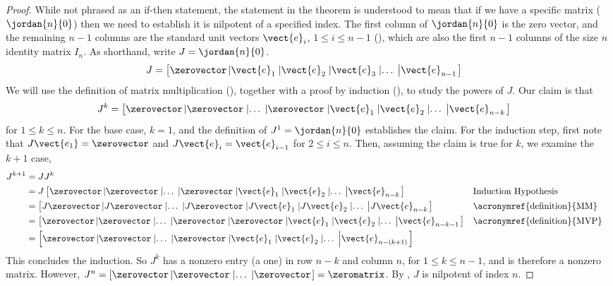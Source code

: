 \begin{proof}
While not phrased as an if-then statement, the statement in the theorem is understood to mean that if we have a specific matrix ($\jordan{n}{0}$) then we need to establish it is nilpotent of a specified index.  The first column of $\jordan{n}{0}$ is the zero vector, and the remaining $n-1$ columns are the standard unit vectors $\vect{e}_i$, $1\leq i\leq n-1$ (), which are also the first $n-1$ columns of the size $n$ identity matrix $I_n$.  As shorthand, write $J=\jordan{n}{0}$.
%
\begin{align*}
J&=
\left[\zerovector\left|\vect{e}_1\right.\left|\vect{e}_2\right.\left|\vect{e}_3\right.\left|\dots\right.\left|\vect{e}_{n-1}\right.\right]
\end{align*}
%
We will use the definition of matrix multiplication (), together with a proof by induction (), to study the powers of $J$.    Our claim is that
%
\begin{align*}
J^k&=
\left[\zerovector\left|\zerovector\right.\left|\dots\right.\left|\zerovector\right.\left|\vect{e}_1\right.\left|\vect{e}_2\right.\left|\dots\right.\left|\vect{e}_{n-k}\right.\right]
\end{align*}
%
for $1\leq k\leq n$.  For the base case, $k=1$, and the definition of $J^1=\jordan{n}{0}$ establishes the claim.  For the induction step, first note that $J\vect{e_1}=\zerovector$ and $J\vect{e}_i=\vect{e}_{i-1}$ for $2\leq i\leq n$.  Then, assuming the claim is true for $k$, we examine the $k+1$ case,
%
\begin{align*}
J^{k+1}
&=JJ^k\\
&=J\left[\zerovector\left|\zerovector\right.\left|\dots\right.\left|\zerovector\right.\left|\vect{e}_1\right.\left|\vect{e}_2\right.\left|\dots\right.\left|\vect{e}_{n-k}\right.\right]
&&\text{Induction Hypothesis}\\
%
&=\left[J\zerovector\left|J\zerovector\right.\left|\dots\right.\left|J\zerovector\right.\left|J\vect{e}_1\right.\left|J\vect{e}_2\right.\left|\dots\right.\left|J\vect{e}_{n-k}\right.\right]&&\text{\acronymref{definition}{MM}}\\
%
&=\left[\zerovector\left|\zerovector\right.\left|\dots\right.\left|\zerovector\right.\left|\zerovector\right.\left|\vect{e}_1\right.\left|\vect{e}_2\right.\left|\dots\right.\left|\vect{e}_{n-k-1}\right.\right]&&\text{\acronymref{definition}{MVP}}\\
%
&=\left[\zerovector\left|\zerovector\right.\left|\dots\right.\left|\zerovector\right.\left|\vect{e}_1\right.\left|\vect{e}_2\right.\left|\dots\right.\left|\vect{e}_{n-(k+1)}\right.\right]
\end{align*}
%
This concludes the induction.  So $J^k$ has a nonzero entry (a one) in row $n-k$ and column $n$, for $1\leq k\leq n-1$, and is therefore a nonzero matrix.  However, $J^n=\left[\zerovector\left|\zerovector\right.\left|\dots\right.\left|\zerovector\right.\right]=\zeromatrix$.  By , $J$ is nilpotent of index $n$.
%
\end{proof}
